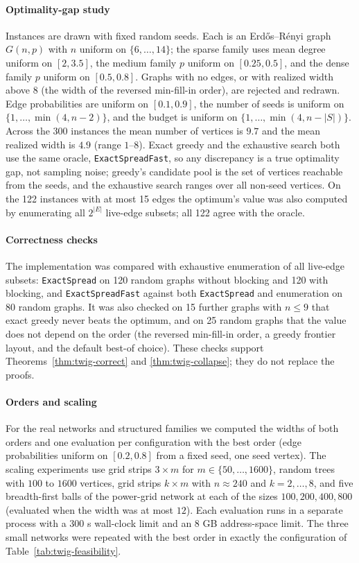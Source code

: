 \documentclass[preprint,11pt]{elsarticle}
\theoremstyle{definition}
\theoremstyle{remark}
\begin{document}
\paragraph{Optimality-gap study} Instances are drawn with fixed random seeds. Each is an Erd\H{o}s--R\'enyi graph $G(n,p)$ with $n$ uniform on $\{6,\dots,14\}$; the sparse family uses mean degree uniform on $[2,3.5]$, the medium family $p$ uniform on $[0.25,0.5]$, and the dense family $p$ uniform on $[0.5,0.8]$. Graphs with no edges, or with realized width above $8$ (the width of the reversed min-fill-in order), are rejected and redrawn. Edge probabilities are uniform on $[0.1,0.9]$, the number of seeds is uniform on $\{1,\dots,\min(4,n-2)\}$, and the budget is uniform on $\{1,\dots,\min(4,n-|S|)\}$. Across the 300 instances the mean number of vertices is $9.7$ and the mean realized width is $4.9$ (range $1$--$8$). Exact greedy and the exhaustive search both use the same oracle, \texttt{ExactSpreadFast}, so any discrepancy is a true optimality gap, not sampling noise; greedy's candidate pool is the set of vertices reachable from the seeds, and the exhaustive search ranges over all non-seed vertices. On the 122 instances with at most 15 edges the optimum's value was also computed by enumerating all $2^{|E|}$ live-edge subsets; all 122 agree with the oracle.

\paragraph{Correctness checks} The implementation was compared with exhaustive enumeration of all live-edge subsets: \texttt{ExactSpread} on 120 random graphs without blocking and 120 with blocking, and \texttt{ExactSpreadFast} against both \texttt{ExactSpread} and enumeration on 80 random graphs. It was also checked on 15 further graphs with $n\le9$ that exact greedy never beats the optimum, and on 25 random graphs that the value does not depend on the order (the reversed min-fill-in order, a greedy frontier layout, and the default best-of choice). These checks support Theorems~\ref{thm:twig-correct} and \ref{thm:twig-collapse}; they do not replace the proofs.

\paragraph{Orders and scaling} For the real networks and structured families we computed the widths of both orders and one evaluation per configuration with the best order (edge probabilities uniform on $[0.2,0.8]$ from a fixed seed, one seed vertex). The scaling experiments use grid strips $3\times m$ for $m\in\{50,\dots,1600\}$, random trees with $100$ to $1600$ vertices, grid strips $k\times m$ with $n\approx240$ and $k=2,\dots,8$, and five breadth-first balls of the power-grid network at each of the sizes $100,200,400,800$ (evaluated when the width was at most $12$). Each evaluation runs in a separate process with a 300 s wall-clock limit and an 8 GB address-space limit. The three small networks were repeated with the best order in exactly the configuration of Table~\ref{tab:twig-feasibility}.
\end{document}

